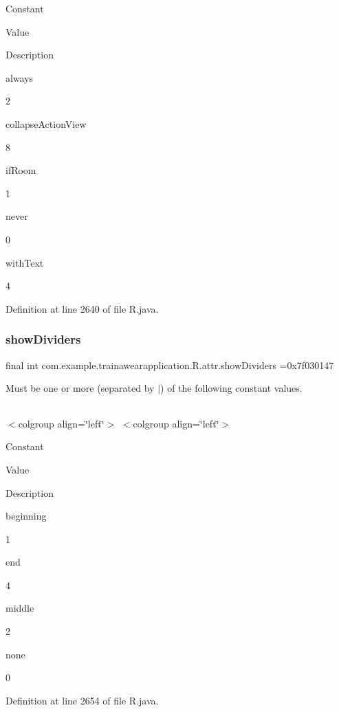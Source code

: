 Constant

Value

Description 

always

2

collapse\+Action\+View

8

if\+Room

1

never

0

with\+Text

4

Definition at line 2640 of file R.\+java.

\mbox{\label{classcom_1_1example_1_1trainawearapplication_1_1_r_1_1attr_a3e4000abd179e0d820539cb5828c1ab7}} 
\subsubsection{\texorpdfstring{showDividers}{showDividers}}
{\footnotesize\ttfamily final int com.\+example.\+trainawearapplication.\+R.\+attr.\+show\+Dividers =0x7f030147\hspace{0.3cm}{\ttfamily [static]}}

Must be one or more (separated by \textquotesingle{}$\vert$\textquotesingle{}) of the following constant values.

\tabulinesep=1mm
\begin{longtabu}spread 0pt [c]{*{0}{|X[-1]}|}
\hline
\end{longtabu}
$<$colgroup align=\char`\"{}left\char`\"{}$>$ $<$colgroup align=\char`\"{}left\char`\"{}$>$ 

Constant

Value

Description 

beginning

1

end

4

middle

2

none

0

Definition at line 2654 of file R.\+java.

